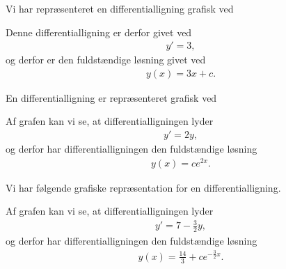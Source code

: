 \begin{exa}
	Vi har repræsenteret en differentialligning grafisk ved
	\begin{center}
	\end{center}
	Denne differentialligning er derfor givet ved
	\begin{align*}
		y' = 3, 
	\end{align*}
	og derfor er den fuldstændige løsning givet ved
	\begin{align*}
		y(x) = 3x+c.
	\end{align*}
\end{exa}
\begin{exa}
	En differentialligning er repræsenteret grafisk ved
	\begin{center}
	\end{center}
	Af grafen kan vi se, at differentialligningen lyder
	\begin{align*}
		y' = 2y,
	\end{align*}
	og derfor har differentialligningen den fuldstændige løsning
	\begin{align*}
		y(x) = ce^{2x}.
	\end{align*}
\end{exa}


\begin{exa}
	Vi har følgende grafiske repræsentation for en differentialligning.
	\begin{center}
	\end{center}
	Af grafen kan vi se, at differentialligningen lyder
	\begin{align*}
		y' = 7-\frac{3}{2}y,
	\end{align*}
	og derfor har differentialligningen den fuldstændige løsning
	\begin{align*}
		y(x) = \frac{14}{3} + ce^{-\frac{3}{2}x}.
	\end{align*}
\end{exa}

